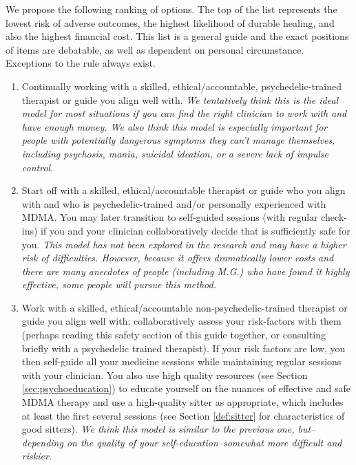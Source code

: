 \documentclass[12pt,letterpaper]{book}
\begin{document}
We propose the following ranking of options. The top of the list represents the lowest risk of adverse outcomes, the highest likelihood of durable healing, and also the highest financial cost. This list is a general guide and the exact positions of items are debatable, as well as dependent on personal circumstance. Exceptions to the rule always exist.
\begin{enumerate}
    \item Continually working with a skilled, ethical/accountable, psychedelic-trained therapist or guide you align well with. \textit{We tentatively think this is the ideal model for most situations if you can find the right clinician to work with and have enough money. We also think this model is especially important for people with potentially dangerous symptoms they can't manage themselves, including psychosis, mania, suicidal ideation, or a severe lack of impulse control.}
    \item Start off with a skilled, ethical/accountable therapist or guide who you align with and who is psychedelic-trained and/or personally experienced with MDMA. You may later transition to self-guided sessions (with regular check-ins) if you and your clinician collaboratively decide that is sufficiently safe for you. \textit{This model has not been explored in the research and may have a higher risk of difficulties. However, because it offers dramatically lower costs and there are many anecdotes of people (including M.G.) who have found it highly effective, some people will pursue this method.}
    \item Work with a skilled, ethical/accountable non-psychedelic-trained therapist or guide you align well with; collaboratively assess your risk-factors with them (perhaps reading this safety section of this guide together, or consulting briefly with a psychedelic trained therapist). If your risk factors are low, you then self-guide all your medicine sessions while maintaining regular sessions with your clinician. You also use high quality resources (see Section \ref{sec:psychoeducation}) to educate yourself on the nuances of effective and safe MDMA therapy and use a high-quality sitter as appropriate, which includes at least the first several sessions (see Section \ref{def:sitter} for characteristics of good sitters). \textit{We think this model is similar to the previous one, but–depending on the quality of your self-education–somewhat more difficult and riskier.}

\end{enumerate}
\end{document}
